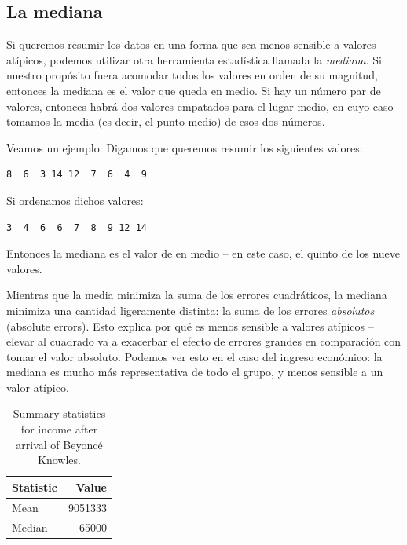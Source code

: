 \documentclass[
  12pt,
]{book}
\begin{document}
\hypertarget{la-mediana}{%
\subsection{La mediana}\label{la-mediana}}

Si queremos resumir los datos en una forma que sea menos sensible a valores atípicos, podemos utilizar otra herramienta estadística llamada la \emph{mediana}. Si nuestro propósito fuera acomodar todos los valores en orden de su magnitud, entonces la mediana es el valor que queda en medio. Si hay un número par de valores, entonces habrá dos valores empatados para el lugar medio, en cuyo caso tomamos la media (es decir, el punto medio) de esos dos números.

Veamos un ejemplo: Digamos que queremos resumir los siguientes valores:

\begin{verbatim}
8  6  3 14 12  7  6  4  9
\end{verbatim}

Si ordenamos dichos valores:

\begin{verbatim}
3  4  6  6  7  8  9 12 14
\end{verbatim}

Entonces la mediana es el valor de en medio -- en este caso, el quinto de los nueve valores.

Mientras que la media minimiza la suma de los errores cuadráticos, la mediana minimiza una cantidad ligeramente distinta: la suma de los errores \emph{absolutos} (absolute errors). Esto explica por qué es menos sensible a valores atípicos -- elevar al cuadrado va a exacerbar el efecto de errores grandes en comparación con tomar el valor absoluto. Podemos ver esto en el caso del ingreso económico: la mediana es mucho más representativa de todo el grupo, y menos sensible a un valor atípico.

\begin{table}

\caption{\label{tab:unnamed-chunk-17}Summary statistics for income after arrival of Beyoncé Knowles.}
\centering
\begin{tabular}[t]{l|r}
\hline
Statistic & Value\\
\hline
Mean & 9051333\\
\hline
Median & 65000\\
\hline
\end{tabular}
\end{table}
\end{document}

